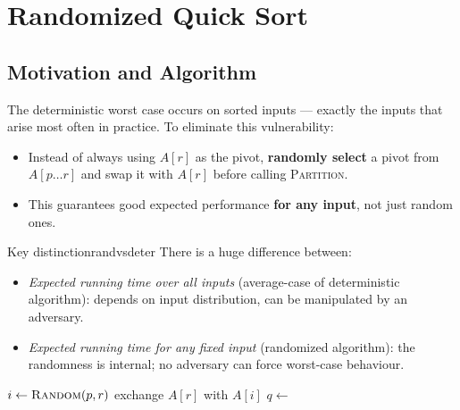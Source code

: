 \section*{Randomized Quick Sort}

\subsection{Motivation and Algorithm}

The deterministic worst case occurs on sorted inputs — exactly the inputs that arise most
often in practice. To eliminate this vulnerability:

\begin{itemize}[noitemsep]
  \item Instead of always using $A[r]$ as the pivot, \textbf{randomly select} a pivot from
        $A[p \ldots r]$ and swap it with $A[r]$ before calling \textsc{Partition}.
  \item This guarantees good expected performance \textbf{for any input}, not just random ones.
\end{itemize}

\begin{remark}{Key distinction}{randvsdeter}
There is a huge difference between:
\begin{itemize}[noitemsep]
  \item \emph{Expected running time over all inputs} (average-case of deterministic algorithm):
        depends on input distribution, can be manipulated by an adversary.
  \item \emph{Expected running time for any fixed input} (randomized algorithm): the randomness
        is internal; no adversary can force worst-case behaviour.
\end{itemize}
\end{remark}

\begin{algorithm}[H]
\caption{Randomized Quick Sort}
\begin{algorithmic}[1]
  \State $i \gets \text{\textsc{Random}}(p, r)$ 
  \State exchange $A[r]$ with $A[i]$
  \State \Return {}
\EndProcedure
{}
    \State $q \gets$ 
    \State {}
    \State {}
  \EndIf
\EndProcedure
\end{algorithmic}
\end{algorithm}

